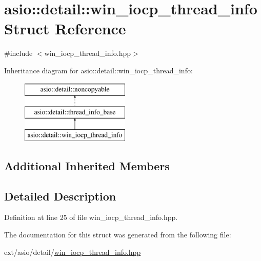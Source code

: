 \hypertarget{structasio_1_1detail_1_1win__iocp__thread__info}{}\section{asio\+:\+:detail\+:\+:win\+\_\+iocp\+\_\+thread\+\_\+info Struct Reference}
\label{structasio_1_1detail_1_1win__iocp__thread__info}


{\ttfamily \#include $<$win\+\_\+iocp\+\_\+thread\+\_\+info.\+hpp$>$}

Inheritance diagram for asio\+:\+:detail\+:\+:win\+\_\+iocp\+\_\+thread\+\_\+info\+:\begin{figure}[H]
\begin{center}
\leavevmode
\includegraphics[height=3.000000cm]{structasio_1_1detail_1_1win__iocp__thread__info}
\end{center}
\end{figure}
\subsection*{Additional Inherited Members}


\subsection{Detailed Description}


Definition at line 25 of file win\+\_\+iocp\+\_\+thread\+\_\+info.\+hpp.



The documentation for this struct was generated from the following file\+:\begin{DoxyCompactItemize}
\item 
ext/asio/detail/\hyperlink{win__iocp__thread__info_8hpp}{win\+\_\+iocp\+\_\+thread\+\_\+info.\+hpp}\end{DoxyCompactItemize}
